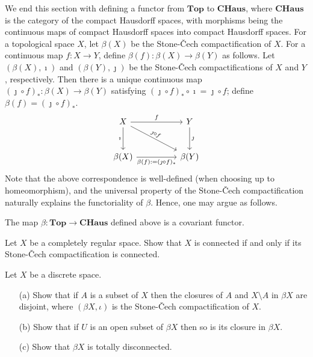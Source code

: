 We end this section with defining a functor from $\textbf{Top}$ to $\textbf{CHaus}$, where $\textbf{CHaus}$ is the category of the compact Hausdorff spaces, with morphisms being the continuous maps of compact Hausdorff spaces into compact Hausdorff spaces.
For a topological space $X$, let $\beta(X)$ be the Stone-\v{C}ech compactification of $X$.
For a continuous map $f: X\rightarrow Y$, define $\beta(f): \beta(X)\rightarrow\beta(Y)$ as follows.
Let $(\beta(X), \imath)$ and $(\beta(Y), \jmath)$ be the Stone-\v{C}ech compactifications of $X$ and $Y$, respectively.
Then there is a unique continuous map $(\jmath\circ f)_*: \beta(X)\rightarrow\beta(Y)$ satisfying $(\jmath\circ f)_*\circ\imath=\jmath\circ f$; define $\beta(f)=(\jmath\circ f)_*$.
\begin{equation*}
\begin{tikzcd}[row sep=large, column sep=huge]
    X
    \arrow[r, "f"]
    \arrow[d, "\imath"']
    \arrow[dr, "\jmath\circ f"{sloped}]
    &
    Y
    \arrow[d, "\jmath"]
    \\
    \beta(X)
    \arrow[r, "\beta(f):=(\jmath\circ f)_*"']
    &
    \beta(Y)
\end{tikzcd}
\end{equation*}
Note that the above correspondence is well-defined (when choosing up to homeomorphism), and the universal property of the Stone-\v{C}ech compactification naturally explains the functoriality of $\beta$.
Hence, one may argue as follows.
\begin{prop}
    The map $\beta: \textbf{Top}\rightarrow\textbf{CHaus}$ defined above is a covariant functor.
\end{prop}

\begin{prob}
    Let $X$ be a completely regular space.
    Show that $X$ is connected if and only if its Stone-\v{C}ech compactification is connected.
\end{prob}
\begin{sol}
    
\end{sol}

\begin{prob}
    Let $X$ be a discrete space.
    \begin{enumerate}
        \item[(a)]
        {
            Show that if $A$ is a subset of $X$ then the closures of $A$ and $X\setminus A$ in $\beta X$ are disjoint, where $(\beta X, \iota)$ is the Stone-\v{C}ech compactification of $X$.
        }
        \item[(b)]
        {
            Show that if $U$ is an open subset of $\beta X$ then so is its closure in $\beta X$.
        }
        \item[(c)]
        {
            Show that $\beta X$ is totally disconnected.
        }
    \end{enumerate}
\end{prob}